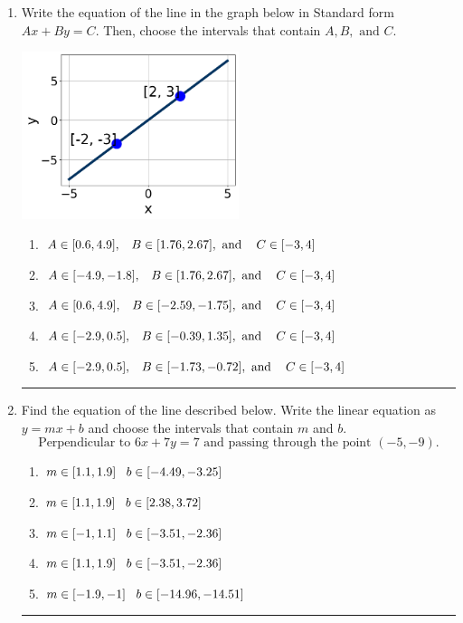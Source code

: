 \documentclass[14pt]{extbook}
\newcommand{\litem}[1]{\item#1\hspace*{-1cm}\rule{\textwidth}{0.4pt}}
\begin{document}
\begin{enumerate}
\litem{
Write the equation of the line in the graph below in Standard form $Ax+By=C$. Then, choose the intervals that contain $A, B, \text{ and } C$.
\begin{center}
    \includegraphics[width=0.5\textwidth]{../Figures/linearGraphToStandardA.png}
\end{center}
\begin{enumerate}[label=\Alph*.]
\item \( A \in [0.6, 4.9], \hspace{3mm} B \in [1.76, 2.67], \text{ and } \hspace{3mm} C \in [-3, 4] \)
\item \( A \in [-4.9, -1.8], \hspace{3mm} B \in [1.76, 2.67], \text{ and } \hspace{3mm} C \in [-3, 4] \)
\item \( A \in [0.6, 4.9], \hspace{3mm} B \in [-2.59, -1.75], \text{ and } \hspace{3mm} C \in [-3, 4] \)
\item \( A \in [-2.9, 0.5], \hspace{3mm} B \in [-0.39, 1.35], \text{ and } \hspace{3mm} C \in [-3, 4] \)
\item \( A \in [-2.9, 0.5], \hspace{3mm} B \in [-1.73, -0.72], \text{ and } \hspace{3mm} C \in [-3, 4] \)

\end{enumerate} }
\litem{
Find the equation of the line described below. Write the linear equation as $ y=mx+b $ and choose the intervals that contain $m$ and $b$.\[ \text{Perpendicular to } 6 x + 7 y = 7 \text{ and passing through the point } (-5, -9). \]\begin{enumerate}[label=\Alph*.]
\item \( m \in [1.1, 1.9] \hspace*{3mm} b \in [-4.49, -3.25] \)
\item \( m \in [1.1, 1.9] \hspace*{3mm} b \in [2.38, 3.72] \)
\item \( m \in [-1, 1.1] \hspace*{3mm} b \in [-3.51, -2.36] \)
\item \( m \in [1.1, 1.9] \hspace*{3mm} b \in [-3.51, -2.36] \)
\item \( m \in [-1.9, -1] \hspace*{3mm} b \in [-14.96, -14.51] \)


\end{enumerate}}
\end{enumerate}
\end{document}
